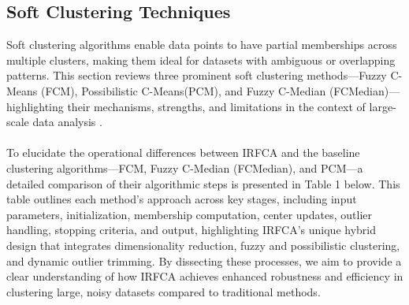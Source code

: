 \documentclass[twoside,11pt]{article}
\renewcommand{\cite}{\citep}
\begin{document}
\subsection{Soft Clustering Techniques}
Soft clustering algorithms enable data points to have partial memberships across multiple clusters, making them ideal for datasets with ambiguous or overlapping patterns. This section reviews three prominent soft clustering methods—Fuzzy C-Means (FCM), Possibilistic C-Means(PCM), and Fuzzy C-Median (FCMedian)—highlighting their mechanisms, strengths, and limitations in the context of large-scale data analysis \cite{zhu2023}\cite{hashemi2023}\cite{panapakidis2019}\cite{kodipalli2023}.
\\\\
To elucidate the operational differences between IRFCA and the baseline clustering algorithms—FCM, Fuzzy C-Median (FCMedian), and PCM—a detailed comparison of their algorithmic steps is presented in Table 1 below. This table outlines each method’s approach across key stages, including input parameters, initialization, membership computation, center updates, outlier handling, stopping criteria, and output, highlighting IRFCA’s unique hybrid design that integrates dimensionality reduction, fuzzy and possibilistic clustering, and dynamic outlier trimming. By dissecting these processes, we aim to provide a clear understanding of how IRFCA achieves enhanced robustness and efficiency in clustering large, noisy datasets compared to traditional methods.
\end{document}
